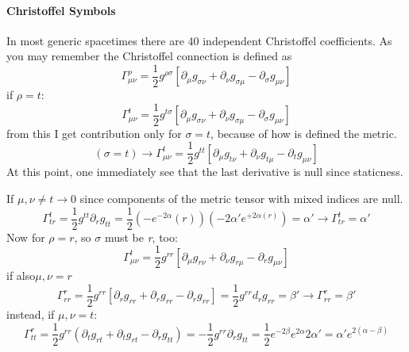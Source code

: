 \paragraph{Christoffel Symbols}
 In most generic spacetimes there are 40 independent Christoffel coefficients. %
As you may remember the Christoffel connection is defined as
\begin{equation}
	\Gamma ^{\rho }_{\mu \nu } = \frac{1}{2}g^{\rho \sigma }\left[ \partial_{\mu }g_{\sigma \nu }+\partial_{\nu }g_{\sigma \mu }-\partial_{\sigma }g_{\mu \nu }\right]
\end{equation}
if $\rho = t $:
\begin{equation}
	\Gamma^{t}_{\mu \nu } = \frac{1}{2} g^{t\sigma } \left[ \partial_{\mu }g_{\sigma \nu }+\partial_{\nu }g_{\sigma \mu }- \partial_{\sigma }g_{\mu \nu }\right]
\end{equation}
from this I get contribution only for $\sigma =t$, because of how is defined the metric. 
\begin{equation}
	\left( \sigma = t \right) \to \Gamma ^{t}_{\mu \nu } = \frac{1}{2}g^{tt}\left[ \partial_{\mu }g_{t\nu } + \partial_{\nu }g_{t\mu } - \partial_{t}g_{\mu \nu }\right]
\end{equation}
At this point, one immediately see that the last derivative is null since staticness.\par
If $\mu , \nu \neq t \to 0$ since components of the metric tensor with mixed indices are null. 
\begin{equation}
\Gamma ^{t}_{tr} = \frac{1}{2} g^{tt}\partial_{r}g_{tt} = \frac{1}{2} \left( -e^{-2\alpha }\left( r \right) \right)\left( -2\alpha ' e^{+2\alpha \left( r \right)} \right) = \alpha ' \to \Gamma ^{t}_{tr} = \alpha '
\end{equation}
Now for $\rho =r$, so $\sigma $ must be \emph{r}, too:
\begin{equation}
	\Gamma ^{t}_{\mu \nu } = \frac{1}{2} g^{rr}\left[ \partial_{\mu }g_{r\nu }+ \partial_{\nu }g_{r\mu }-\partial_{r}g_{\mu \nu }\right]
\end{equation}
if  also$\mu ,\nu  = r$
\begin{equation}
	\Gamma ^{r}_{rr} = \frac{1}{2} g^{rr}\left[ \partial_{r}g_{rr}+\partial_{r}g_{rr}-\partial_{r}g_{rr}\right] = \frac{1}{2}g^{rr}d_{r}g_{rr} = \beta ' \to  \Gamma ^{r}_{rr} = \beta '
\end{equation}
instead, if $\mu ,\nu  = t$:
\begin{equation}
\Gamma^{r}_{tt} = \frac{1}{2}g^{rr} \left( \partial_{t}g_{rt} +\partial_{t}g_{rt}-\partial_{r}g_{tt} \right) = -\frac{1}{2} g^{rr}\partial_{r}g_{tt} = \frac{1}{2}e^{-2\beta }e^{2\alpha }2\alpha ' = \alpha ' e^{2\left( \alpha -\beta  \right)}
\end{equation}
